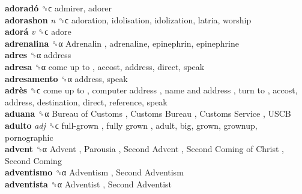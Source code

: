 \textbf{adoradó} ␝ϲ  admirer, adorer  \\
\textbf{adorashon} \emph{n}  ␝ϲ  adoration, idolisation, idolization, latria, worship  \\
\textbf{adorá} \emph{v}  ␝ϲ  adore  \\
\textbf{adrenalina} ␝α   Adrenalin , adrenaline, epinephrin, epinephrine  \\
\textbf{adres} ␝α  address  \\
\textbf{adresa} ␝α   come up to , accost, address, direct, speak  \\
\textbf{adresamento} ␝α  address, speak  \\
\textbf{adrès} ␝ϲ   come up to ,  computer address ,  name and address ,  turn to , accost, address, destination, direct, reference, speak  \\
\textbf{aduana} ␝α   Bureau of Customs ,  Customs Bureau ,  Customs Service ,  USCB   \\
\textbf{adulto} \emph{adj}  ␝ϲ   full-grown ,  fully grown , adult, big, grown, grownup, pornographic  \\
\textbf{advent} ␝α   Advent ,  Parousia ,  Second Advent ,  Second Coming of Christ ,  Second Coming   \\
\textbf{adventismo} ␝α   Adventism ,  Second Adventism   \\
\textbf{adventista} ␝α   Adventist ,  Second Adventist   \\
